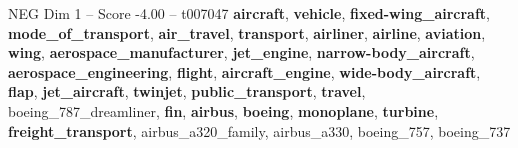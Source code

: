 \begin{textsample}{NEG Dim 1 – Score -4.00 – t007047}  \label{ex:f1_neg_018}
\textbf{aircraft}, \textbf{vehicle}, \textbf{fixed-wing\_aircraft}, \textbf{mode\_of\_transport}, \textbf{air\_travel}, \textbf{transport}, \textbf{airliner}, \textbf{airline}, \textbf{aviation}, \textbf{wing}, \textbf{aerospace\_manufacturer}, \textbf{jet\_engine}, \textbf{narrow-body\_aircraft}, \textbf{aerospace\_engineering}, \textbf{flight}, \textbf{aircraft\_engine}, \textbf{wide-body\_aircraft}, \textbf{flap}, \textbf{jet\_aircraft}, \textbf{twinjet}, \textbf{public\_transport}, \textbf{travel}, boeing\_787\_dreamliner, \textbf{fin}, \textbf{airbus}, \textbf{boeing}, \textbf{monoplane}, \textbf{turbine}, \textbf{freight\_transport}, airbus\_a320\_family, airbus\_a330, boeing\_757, boeing\_737

\end{textsample}
